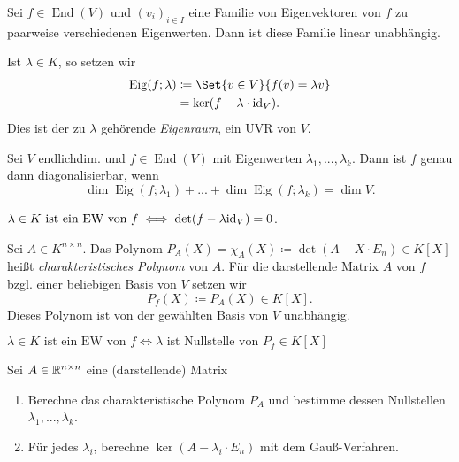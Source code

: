 \documentclass{cheat-sheet}
\DeclareMathOperator{\End}{End}
\DeclareMathOperator{\Eig}{Eig}
\begin{document}
\begin{satz}
  Sei $f \in \End(V)$ und $(v_i)_{i \in I}$ eine Familie von Eigenvektoren von $f$ zu paarweise verschiedenen Eigenwerten. Dann ist diese Familie linear unabhängig.
\end{satz}

\begin{defn}
  Ist $\lambda \in K$, so setzen wir
  \begin{align*}
    \Eig(f; \lambda) &\coloneqq \Set{ v \in V }{ f(v) = \lambda v }\\
    &= \ker(f - \lambda \cdot \id_V).
  \end{align*}
  Dies ist der zu $\lambda$ gehörende \emph{Eigenraum}, ein UVR von $V$.
\end{defn}

\begin{satz}
  Sei $V$ endlichdim. und $f \in \End(V)$ mit Eigenwerten $\lambda_1, ..., \lambda_k$. Dann ist $f$ genau dann diagonalisierbar, wenn
  \[ \dim \Eig(f; \lambda_1) + ... + \dim \Eig(f; \lambda_k) = \dim V. \]
\end{satz}

\begin{satz}
  $\lambda \in K \text{ ist ein EW von } f \iff \det(f - \lambda \mathrm{id}_V) = 0$.
\end{satz}

\begin{defn}
  Sei $A \in K^{n \times n}$. Das Polynom $P_A(X) = \chi_A(X) \coloneqq \det(A - X \cdot E_n) \in K[X]$ heißt \emph{charakteristisches Polynom} von $A$. Für die darstellende Matrix $A$ von $f$ bzgl. einer beliebigen Basis von $V$ setzen wir
  \[ P_f(X) \coloneqq P_A(X) \in K[X]. \]
  Dieses Polynom ist von der gewählten Basis von $V$ unabhängig.
\end{defn}

\begin{satz}
  $\lambda \in K \text{ ist ein EW von } f \iff \lambda \text{ ist Nullstelle von } P_f \in K[X]$
\end{satz}

\begin{verf}
  Sei $A \in \mathbb{R}^{n \times n}$ eine (darstellende) Matrix
  \begin{enumerate}
    \item Berechne das charakteristische Polynom $P_A$ und bestimme dessen Nullstellen $\lambda_1, ..., \lambda_k$.
    \item Für jedes $\lambda_i$, berechne $\ker (A - \lambda_i \cdot E_n)$ mit dem Gauß-Verfahren.
  \end{enumerate}
\end{verf}
\end{document}
